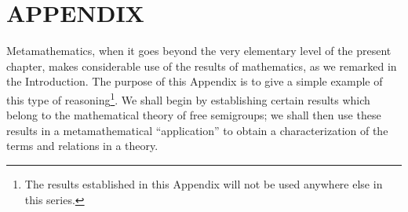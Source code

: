 \section*{APPENDIX}
{}
\setcounter{subsection}{0}


Metamathematics, when it goes beyond the very elementary level of the present chapter, makes considerable use of the results of mathematics, as we remarked in the Introduction. The purpose of this Appendix is to give a simple example of this type of reasoning\footnote{The results established in this Appendix will not be used anywhere else in this series.}. We shall begin by establishing certain results which belong to the mathematical theory of free semigroups; we shall then use these results in a metamathematical ``application'' to obtain a characterization of the terms and relations in a theory.

